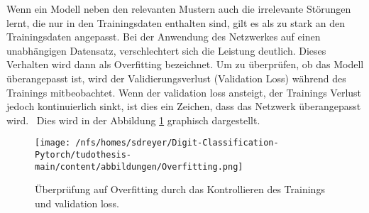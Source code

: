 Wenn ein Modell neben den relevanten Mustern auch die irrelevante Störungen lernt, die nur in den Trainingsdaten enthalten sind, gilt es als zu stark an den Trainingsdaten angepasst.
Bei der Anwendung des Netzwerkes auf einen unabhängigen Datensatz, verschlechtert sich die Leistung deutlich. 
Dieses Verhalten wird dann als Overfitting bezeichnet.
Um zu überprüfen, ob das Modell überangepasst ist, wird der Validierungsverlust (Validation Loss) während des Trainings mitbeobachtet.
Wenn der validation loss ansteigt, der Trainings Verlust jedoch kontinuierlich sinkt, ist dies ein Zeichen, dass das Netzwerk überangepasst wird.~\cite{Yamashita2018}
Dies wird in der Abbildung \ref{fig:overfitting} graphisch dargestellt.
\begin{figure}[H]
  \centering
  \texttt{[image: /nfs/homes/sdreyer/Digit-Classification-Pytorch/tudothesis-main/content/abbildungen/Overfitting.png]}
  \caption{Überprüfung auf Overfitting durch das Kontrollieren des Trainings und validation loss.~\cite{Yamashita2018}}
  \label{fig:overfitting}
\end{figure}
